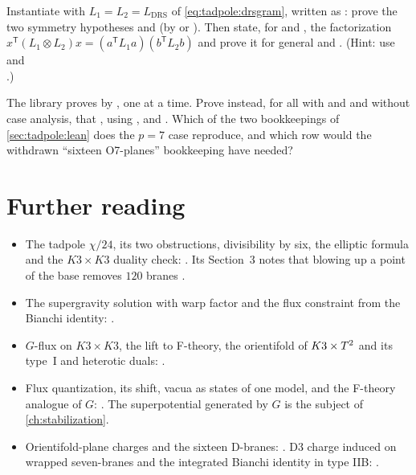\begin{exercise}
Instantiate  with
$L_1=L_2=L_{\mathrm{DRS}}$ of \eqref{eq:tadpole:drsgram}, written as
\lean{!![0,2,2;2,0,2;2,2,0]}: prove the two symmetry hypotheses and  (by
 or ). Then state, for  and
, the factorization
$x^{\mathsf T}(L_1\otimes L_2)x=(a^{\mathsf T}L_1a)(b^{\mathsf T}L_2b)$ and prove it for
general  and . (Hint: use 
and\\ .)
\end{exercise}

\begin{exercise}\label{exe:tadpole:leanoplane}
The library proves  by , one  at a time.
Prove instead, for all  with  and  and without case analysis,
that , using
,  and
. Which of the two bookkeepings of \cref{sec:tadpole:lean} does the $p=7$ case
reproduce, and which row would the withdrawn ``sixteen O7-planes'' bookkeeping have needed?
\end{exercise}

\section*{Further reading}
\begin{itemize}[leftmargin=1.5em]
\item The tadpole $\chi/24$, its two obstructions, divisibility by six, the elliptic formula
 and the $K3\times K3$ duality check: . Its Section~3 notes
 that blowing up a point of the base removes $120$ branes .
\item The supergravity solution with warp factor and the flux constraint from the Bianchi
 identity: .
\item $G$-flux on $K3\times K3$, the lift to F-theory, the orientifold of $K3\times T^2$ and its type~I
 and heterotic duals: .
\item Flux quantization, its shift, vacua as states of one model, and the F-theory analogue
 of $G$: . The superpotential generated by
 $G$ is the subject of \cref{ch:stabilization}.
\item Orientifold-plane charges and the sixteen D-branes: . D3 charge induced on wrapped seven-branes and the integrated Bianchi
 identity in type IIB: .
\end{itemize}
